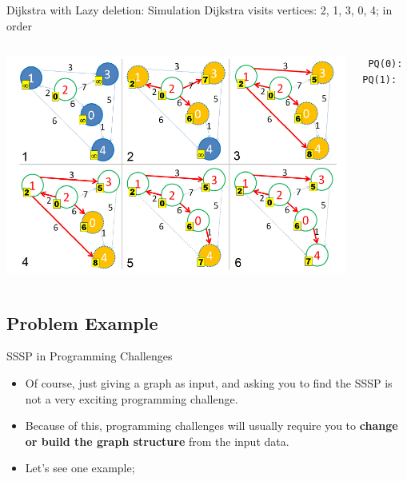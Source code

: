 \begin{frame}[fragile]{Dijkstra with Lazy deletion: Simulation}
  Dijkstra visits vertices: 2, 1, 3, 0, 4; in order
  \begin{columns}[T]
    \begin{center}
      \includegraphics[width=\textwidth]{../img/dijkstra_halim}
    \end{center}
\begin{verbatim}
 PQ(0):   PQ(1):
\end{verbatim}
  \end{columns}
\end{frame}

\subsection{Problem Example}

\begin{frame}{SSSP in Programming Challenges}
  \begin{itemize}
    \item Of course, just giving a graph as input, and asking you to find the SSSP is not a very exciting programming challenge. \bigskip

    \item Because of this, programming challenges will usually require you to {\bf change or build the graph structure} from the input data.\bigskip

    \item Let's see one example;
  \end{itemize}
\end{frame}


